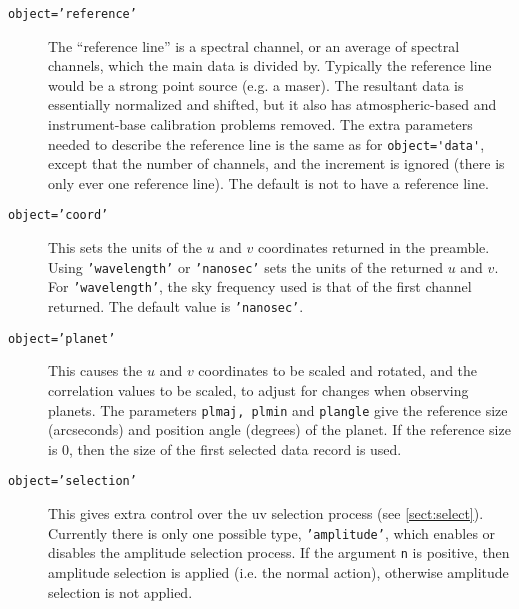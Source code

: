 \documentclass{report}
\begin{document}
\begin{description}
\item[\texttt{object='reference'}] The ``reference line'' is a spectral channel,
or an average of spectral channels, which the main data is divided by. Typically
the reference line would be a strong point source (e.g. a maser). The resultant
data is essentially normalized and shifted, but it also has atmospheric-based
and instrument-base calibration problems removed. The extra parameters needed
to describe the reference line is the same as for \verb+object='data'+, except
that the number of channels, and the increment is ignored (there is only ever
one reference line). The default is not to have a reference line.
\item[\texttt{object='coord'}] This sets the
units of the $u$ and $v$ coordinates returned in the preamble. Using
{\tt 'wavelength'} or {\tt 'nanosec'} sets the units of the returned $u$
and $v$. For {\tt 'wavelength'}, the sky frequency used is that of the first
channel returned. The default value is {\tt 'nanosec'}.
\item[\texttt{object='planet'}] This causes
the $u$ and $v$ coordinates to be scaled and rotated, and the correlation
values to be scaled,
to adjust for changes when observing planets.
The parameters {\tt plmaj, plmin} and {\tt plangle} give the reference
size (arcseconds) and position angle (degrees) of the planet. If the reference
size is 0, then the size of the first selected data record is used.
\item[\texttt{object='selection'}] This gives extra control over the uv
selection process (see \ref{sect:select}). Currently there is only
one possible type, {\tt 'amplitude'}, which enables or disables the
amplitude selection process. If the argument {\tt n} is positive, then
amplitude selection is applied (i.e. the normal action), otherwise
amplitude selection is not applied.
\end{description}
\end{document}
